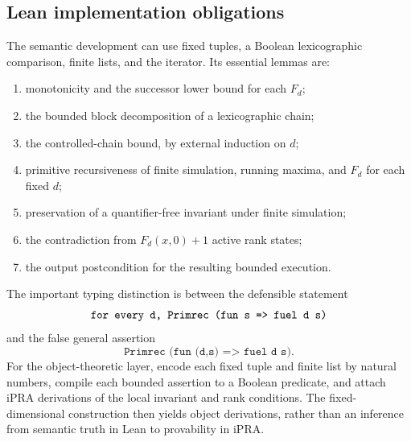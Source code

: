 \subsection{Lean implementation obligations}

The semantic development can use fixed tuples, a Boolean lexicographic
comparison, finite lists, and the iterator.  Its essential lemmas are:
\begin{enumerate}
 \item monotonicity and the successor lower bound for each $F_d$;
 \item the bounded block decomposition of a lexicographic chain;
 \item the controlled-chain bound, by external induction on $d$;
 \item primitive recursiveness of finite simulation, running maxima, and
       $F_d$ for each fixed $d$;
 \item preservation of a quantifier-free invariant under finite
       simulation;
 \item the contradiction from $F_d(x,0)+1$ active rank states;
 \item the output postcondition for the resulting bounded execution.
\end{enumerate}
The important typing distinction is between the defensible statement
\[
 \texttt{\textup{for every }d,\ Primrec\ (fun\ s\ =>\ fuel\ d\ s)}
\]
and the false general assertion
\[
 \texttt{Primrec\ (fun\ (d,s)\ =>\ fuel\ d\ s)}.
\]
For the object-theoretic layer, encode each fixed tuple and finite list
by natural numbers, compile each bounded assertion to a Boolean
predicate, and attach iPRA derivations of the local invariant and rank
conditions.  The fixed-dimensional construction then yields object
derivations, rather than an inference from semantic truth in Lean to
provability in iPRA.
